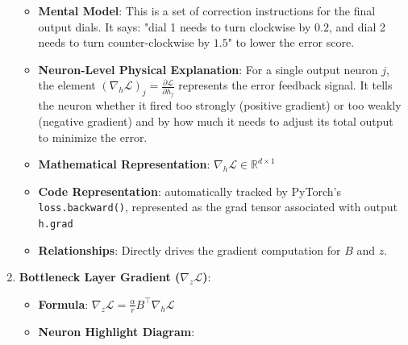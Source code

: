 \documentclass{article}
\begin{document}
\begin{enumerate}
\begin{itemize}
      \item \textbf{Mental Model}: This is a set of correction instructions for the final output dials. It says: "dial 1 needs to turn clockwise by $0.2$, and dial 2 needs to turn counter-clockwise by $1.5$" to lower the error score.
      \item \textbf{Neuron-Level Physical Explanation}: For a single output neuron $j$, the element $(\nabla_h \mathcal{L})_j = \frac{\partial \mathcal{L}}{\partial h_j}$ represents the error feedback signal. It tells the neuron whether it fired too strongly (positive gradient) or too weakly (negative gradient) and by how much it needs to adjust its total output to minimize the error.
      \item \textbf{Mathematical Representation}: $\nabla_h \mathcal{L} \in \mathbb{R}^{d \times 1}$
      \item \textbf{Code Representation}: automatically tracked by PyTorch's \texttt{loss.backward()}, represented as the grad tensor associated with output \texttt{h.grad}
      \item \textbf{Relationships}: Directly drives the gradient computation for $B$ and $z$.
    \end{itemize}

  \item \textbf{Bottleneck Layer Gradient ($\nabla_z \mathcal{L}$)}:
    \begin{itemize}
      \item \textbf{Formula}: $\nabla_z \mathcal{L} = \frac{\alpha}{r} B^\top \nabla_h \mathcal{L}$
      \item \textbf{Neuron Highlight Diagram}:

\begin{center}
\begin{adjustbox}{max width=0.85\linewidth}
\end{adjustbox}
\end{center}
\end{itemize}
\end{enumerate}
\end{document}
